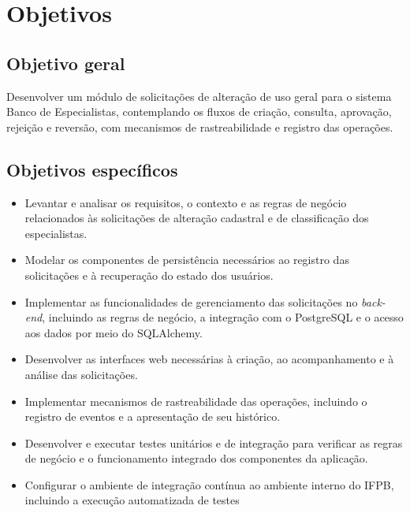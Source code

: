 \section{Objetivos}
\label{sec:objetivos}

\subsection{Objetivo geral}
\label{subsec:objetivo-geral}

Desenvolver um módulo de solicitações de alteração de uso geral para o 
sistema Banco de Especialistas, contemplando os fluxos de criação, consulta, 
aprovação, rejeição e reversão, com mecanismos de rastreabilidade e registro das operações.

\subsection{Objetivos específicos}
\label{subsec:objetivos-especificos}

\begin{itemize}
    \item Levantar e analisar os requisitos, o contexto e as regras de negócio 
    relacionados às solicitações de alteração cadastral e de classificação dos especialistas.
    
    \item Modelar os componentes de persistência necessários ao registro das 
    solicitações e à recuperação do estado dos usuários.
    
    \item Implementar as funcionalidades de gerenciamento das solicitações 
    no \textit{back-end}, incluindo as regras de negócio, a integração com o 
    PostgreSQL e o acesso aos dados por meio do SQLAlchemy.
    
    \item Desenvolver as interfaces web necessárias à criação, ao acompanhamento 
    e à análise das solicitações.
    
    \item Implementar mecanismos de rastreabilidade das operações, incluindo 
    o registro de eventos e a apresentação de seu histórico.
    
    \item Desenvolver e executar testes unitários e de integração para 
    verificar as regras de negócio e o funcionamento integrado dos 
    componentes da aplicação.

    \item Configurar o ambiente de integração contínua ao ambiente
    interno do IFPB, incluindo a execução automatizada de testes

\end{itemize}
